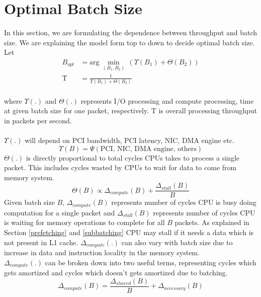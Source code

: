 \section{Optimal Batch Size}
\label{optimalbatchsize}
In this section, we are formulating the dependence between throughput and batch size. We are explaining the model form top to down to decide optimal batch size. Let
\begin{align}
B_{opt} &=  \text{arg}\,\min\limits_{(B_1, B_2)}\, (\Upsilon(B_1) + \Theta(B_2)) \label{bopt}
\\
\text{T} &= \frac{1}{\Upsilon(B_1) + \Theta(B_2)} \label{overall_throughput}
\end{align}
\\
where $\Upsilon(.)$ and $\Theta(.)$ represents I/O processing and compute processing, time at given batch size for one packet, respectively. $\text{T}$ is overall processing throughput in packets per second.\\ \\
$\Upsilon(.)$ will depend on PCI bandwidth, PCI latency, NIC, DMA engine etc.
\begin{equation} 
\label{nic_throughput}
\Upsilon(B) = \Psi(\textrm{PCI, NIC, DMA engine, others})
\end{equation}
$\Theta(.)$ is directly proportional to total cycles CPUs takes to process a single packet. This includes cycles wasted by CPUs to wait for data to come from memory system. 
\\
\begin{equation} 
\label{compute_througput}
\Theta(B) \propto \Delta_{compute}(B) + \frac{\Delta_{stall}(B)}{B}
\end{equation}
Given batch size $B$, $\Delta_{compute}(B)$ represents number of cycles CPU is busy doing computation for a single packet and $\Delta_{stall}(B)$ represents number of cycles CPU  is waiting for memory operations to complete for all $B$ packets. As explained in Section \ref{prefetching}  and \ref{subbatching} CPU may stall if it needs a data which is not present in L1 cache. $\Delta_{compute}(.)$ can also vary with batch size due to increase in data and instruction locality in the memory system.
\\
$\Delta_{compute}(.)$ can be broken down into two useful terms, representing cycles which gets amortized and cycles which doesn't gets amortized due to batching.
\\
\begin{equation} 
\label{cycles_compute}
\Delta_{compute}(B) = \frac{\Delta_{shared}(B)}{B} + \Delta_{necessary}(B)
\end{equation}
